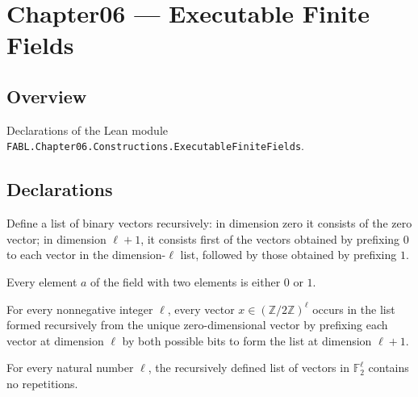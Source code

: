 \chapter{Chapter06 — Executable Finite Fields}
\section{Overview}

Declarations of the Lean module \texttt{FABL.Chapter06.Constructions.ExecutableFiniteFields}.

\section{Declarations}

\begin{definition}
\label{FABL.allBinaryVectors}
\leanok
{}
Define a list of binary vectors recursively: in dimension zero it consists of the zero
vector; in dimension $\ell+1$, it consists first of the vectors obtained by prefixing
$0$ to each vector in the dimension-$\ell$ list, followed by those obtained by prefixing
$1$.
\end{definition}

\begin{theorem}
\leanok
{}
Every element $a$ of the field with two elements is either $0$ or $1$.
\end{theorem}

\begin{theorem}
\label{FABL.mem_allBinaryVectors}
\leanok
{}
For every nonnegative integer $\ell$, every vector $x \in (\mathbb Z/2\mathbb Z)^\ell$
occurs in the list formed recursively from the unique zero-dimensional vector by
prefixing each vector at dimension $\ell$ by both possible bits to form the list at
dimension $\ell+1$.
\end{theorem}

\begin{theorem}
\label{FABL.allBinaryVectors_nodup}
\leanok
{}
For every natural number $\ell$, the recursively defined list of vectors in
$\mathbb{F}_2^\ell$ contains no repetitions.
\end{theorem}

